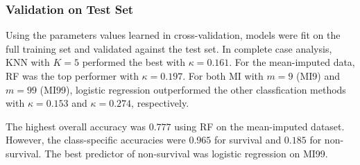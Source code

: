 \documentclass[12pt,]{article}
\begin{document}
\subsubsection{Validation on Test Set}\label{validation-on-test-set}

Using the parameters values learned in cross-validation, models were fit
on the full training set and validated against the test set. In complete
case analysis, KNN with \(K=5\) performed the best with
\(\kappa=0.161\). For the mean-imputed data, RF was the top performer
with \(\kappa=0.197\). For both MI with \(m=9\) (MI9) and \(m=99\)
(MI99), logistic regression outperformed the other classfication methods
with \(\kappa=0.153\) and \(\kappa=0.274\), respectively.

The highest overall accuracy was \(0.777\) using RF on the mean-imputed
dataset. However, the class-specific accuracies were \(0.965\) for
survival and \(0.185\) for non-survival. The best predictor of
non-survival was logistic regression on MI99.
\end{document}
